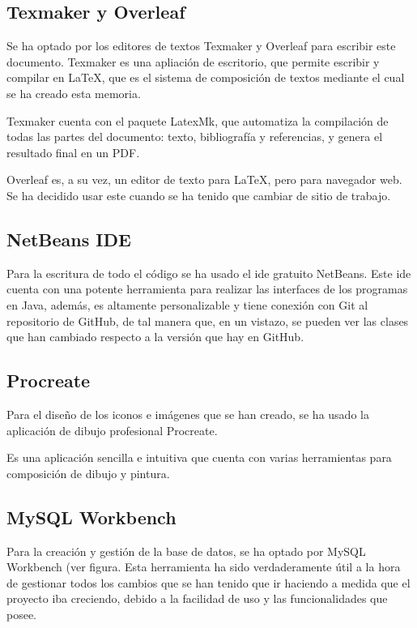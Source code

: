 \subsection{Texmaker y Overleaf}
Se ha optado por los editores de textos Texmaker y Overleaf para escribir este documento. Texmaker es una apliación de escritorio, que permite escribir y compilar en \LaTeX{}, que es el sistema de composición de textos mediante el cual se ha creado esta memoria.

Texmaker cuenta con el paquete LatexMk, que automatiza la compilación de todas las partes del documento: texto, bibliografía y referencias, y genera el resultado final en un PDF.

Overleaf \cite{overleaf} es, a su vez, un editor de texto para \LaTeX{}, pero para navegador web. Se ha decidido usar este cuando se ha tenido que cambiar de sitio de trabajo.

\subsection{NetBeans IDE}
Para la escritura de todo el código se ha usado el \gls{ide} gratuito NetBeans.
Este \gls{ide} cuenta con una potente herramienta para realizar las interfaces de los programas en Java, además, es altamente personalizable y tiene conexión con Git al repositorio de GitHub, de tal manera que, en un vistazo, se pueden ver las clases que han cambiado respecto a la versión que hay en GitHub.


\subsection{Procreate}
\label{sub:procreate}
Para el diseño de los iconos e imágenes que se han creado, se ha usado la aplicación de dibujo profesional Procreate.

Es una aplicación sencilla e intuitiva que cuenta con varias herramientas para composición de dibujo y pintura.


\subsection{MySQL Workbench}
\label{sub:mysql}
Para la creación y gestión de la base de datos, se ha optado por MySQL Workbench (ver figura. Esta herramienta ha sido verdaderamente útil a la hora de gestionar todos los cambios que se han tenido que ir haciendo a medida que el proyecto iba creciendo, debido a la facilidad de uso y las funcionalidades que posee.


